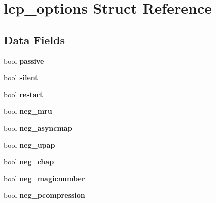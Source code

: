 \hypertarget{structlcp__options}{}\section{lcp\+\_\+options Struct Reference}
\label{structlcp__options}
\subsection*{Data Fields}
\begin{DoxyCompactItemize}
\item 
\mbox{\label{structlcp__options_a44fccbb4d34a71878055ebebf41c359c}} 
bool {\bfseries passive}
\item 
\mbox{\label{structlcp__options_a3603a1f4372659e09a06f6aa9ab8480c}} 
bool {\bfseries silent}
\item 
\mbox{\label{structlcp__options_af32ac95e5df0ba0af8637543873b396c}} 
bool {\bfseries restart}
\item 
\mbox{\label{structlcp__options_a99ad887d7a728fceff8ea532c53d472b}} 
bool {\bfseries neg\+\_\+mru}
\item 
\mbox{\label{structlcp__options_a2f1e56f0cb801480f244b844a17e293b}} 
bool {\bfseries neg\+\_\+asyncmap}
\item 
\mbox{\label{structlcp__options_a96a17907bca11e67ceb8b6a23dd9831f}} 
bool {\bfseries neg\+\_\+upap}
\item 
\mbox{\label{structlcp__options_a1869244d1073367b84817ae5decb7610}} 
bool {\bfseries neg\+\_\+chap}
\item 
\mbox{\label{structlcp__options_a7de26e880e07a17c11ba7736a387b2a6}} 
bool {\bfseries neg\+\_\+magicnumber}
\item 
\mbox{\label{structlcp__options_a86ba5f0074d542c34f39dda88863b3db}} 
bool {\bfseries neg\+\_\+pcompression}
\item 
\mbox{\label{structlcp__options_aaf30d3163b31bcb0724d9c0e33e905a8}} 

\end{DoxyCompactItemize}
